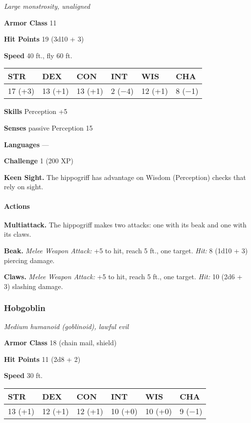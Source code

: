 \documentclass[
]{article}
\begin{document}
\emph{Large monstrosity, unaligned}

\textbf{Armor Class} 11

\textbf{Hit Points} 19 (3d10 + 3)

\textbf{Speed} 40 ft., fly 60 ft.

\begin{longtable}[]{@{}llllll@{}}
\toprule
STR & DEX & CON & INT & WIS & CHA\tabularnewline
\midrule
\endhead
17 (+3) & 13 (+1) & 13 (+1) & 2 (−4) & 12 (+1) & 8 (−1)\tabularnewline
\bottomrule
\end{longtable}

\textbf{Skills} Perception +5

\textbf{Senses} passive Perception 15

\textbf{Languages} ---

\textbf{Challenge} 1 (200 XP)

\textbf{Keen Sight.} The hippogriff has advantage on Wisdom (Perception)
checks that rely on sight.

\hypertarget{actions-6}{%
\paragraph{Actions}\label{actions-6}}

\textbf{Multiattack.} The hippogriff makes two attacks: one with its
beak and one with its claws.

\textbf{Beak.} \emph{Melee Weapon Attack:} +5 to hit, reach 5 ft., one
target. \emph{Hit:} 8 (1d10 + 3) piercing damage.

\textbf{Claws.} \emph{Melee Weapon Attack:} +5 to hit, reach 5 ft., one
target. \emph{Hit:} 10 (2d6 + 3) slashing damage.

\hypertarget{hobgoblin}{%
\subsubsection{Hobgoblin}\label{hobgoblin}}

\emph{Medium humanoid (goblinoid), lawful evil}

\textbf{Armor Class} 18 (chain mail, shield)

\textbf{Hit Points} 11 (2d8 + 2)

\textbf{Speed} 30 ft.

\begin{longtable}[]{@{}llllll@{}}
\toprule
STR & DEX & CON & INT & WIS & CHA\tabularnewline
\midrule
\endhead
13 (+1) & 12 (+1) & 12 (+1) & 10 (+0) & 10 (+0) & 9 (−1)\tabularnewline
\bottomrule
\end{longtable}
\end{document}
